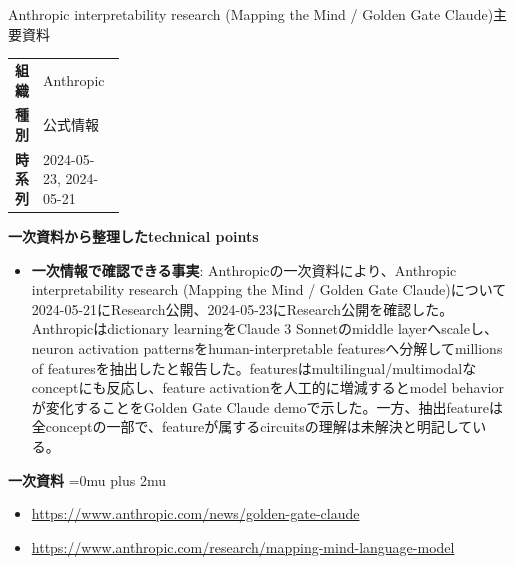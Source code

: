 \begin{technicalnote}{Anthropic interpretability research (Mapping the Mind / Golden Gate Claude)}{主要資料}
\begingroup
\begin{tabularx}{\linewidth}{@{}>{\bfseries}p{0.22\linewidth}X@{}}
組織 & Anthropic \\
種別 & 公式情報 \\
時系列 & 2024-05-23, 2024-05-21 \\
\end{tabularx}
\smallskip
\begin{minipage}{\linewidth}
{\bfseries 一次資料から整理したtechnical points}
\begin{itemize}[leftmargin=1.5em,itemsep=0.35em]
\item \textbf{一次情報で確認できる事実}: Anthropicの一次資料により、Anthropic interpretability research (Mapping the Mind / Golden Gate Claude)について2024-05-21にResearch公開、2024-05-23にResearch公開を確認した。 Anthropicはdictionary learningをClaude 3 Sonnetのmiddle layerへscaleし、neuron activation patternsをhuman-interpretable featuresへ分解してmillions of featuresを抽出したと報告した。featuresはmultilingual/multimodalなconceptにも反応し、feature activationを人工的に増減するとmodel behaviorが変化することをGolden Gate Claude demoで示した。一方、抽出featureは全conceptの一部で、featureが属するcircuitsの理解は未解決と明記している。
\end{itemize}
\begin{minipage}{\linewidth}
\begin{samepage}
{\bfseries 一次資料}
\begingroup\sloppy
\Urlmuskip=0mu plus 2mu\relax
\begin{itemize}[leftmargin=1.5em,itemsep=0.25em]
\item {\scriptsize\url{https://www.anthropic.com/news/golden-gate-claude}}
\item {\scriptsize\url{https://www.anthropic.com/research/mapping-mind-language-model}}
\end{itemize}
\endgroup
\end{samepage}
\end{minipage}
\end{minipage}
\endgroup
\end{technicalnote}
\medskip

